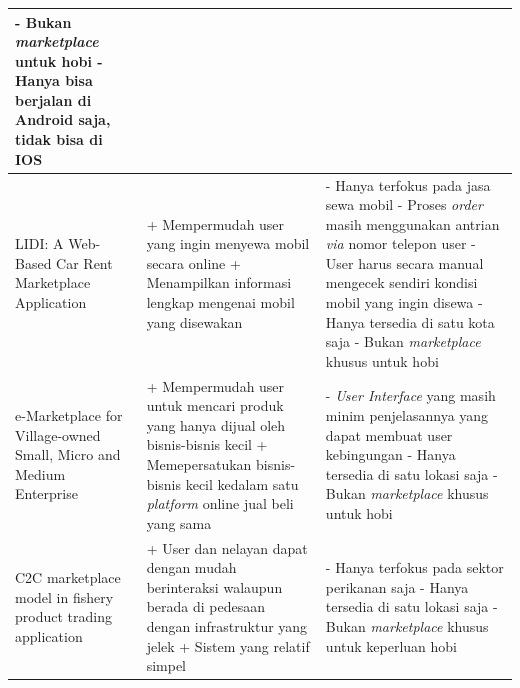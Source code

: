 \documentclass[a4paper]{article}
\begin{document}
\begin{longtable}{|p{3cm}|p{5cm}|p{5cm}|}
    - Bukan \textit{marketplace} untuk hobi \newline
    - Hanya bisa berjalan di Android saja, tidak bisa di IOS                                                                                     \\
    \hline
    LIDI: A Web-Based Car Rent Marketplace Application
             & + Mempermudah user yang ingin menyewa mobil secara online \newline
    + Menampilkan informasi lengkap mengenai mobil yang disewakan \newline
             & - Hanya terfokus pada jasa sewa mobil \newline
    - Proses \textit{order} masih menggunakan antrian \textit{via} nomor telepon user \newline
    - User harus secara manual mengecek sendiri kondisi mobil yang ingin disewa \newline
    - Hanya tersedia di satu kota saja \newline
    - Bukan \textit{marketplace} khusus untuk hobi                                                                                               \\
    \hline
    e-Marketplace for Village-owned Small, Micro and Medium Enterprise
             & + Mempermudah user untuk mencari produk yang hanya dijual oleh bisnis-bisnis kecil \newline
    + Memepersatukan bisnis-bisnis kecil kedalam satu \textit{platform} online jual beli yang sama \newline
             & - \textit{User Interface} yang masih minim penjelasannya yang dapat membuat user kebingungan \newline
    - Hanya tersedia di satu lokasi saja \newline
    - Bukan \textit{marketplace} khusus untuk hobi                                                                                               \\
    \hline
    C2C marketplace model in fishery product trading application
             & + User dan nelayan dapat dengan mudah berinteraksi walaupun berada di pedesaan dengan infrastruktur yang jelek \newline
    + Sistem yang relatif simpel \newline
             & - Hanya terfokus pada sektor perikanan saja \newline
    - Hanya tersedia di satu lokasi saja \newline
    - Bukan \textit{marketplace} khusus untuk keperluan hobi                                                                                     \\
    \hline
\end{longtable}
\end{document}
